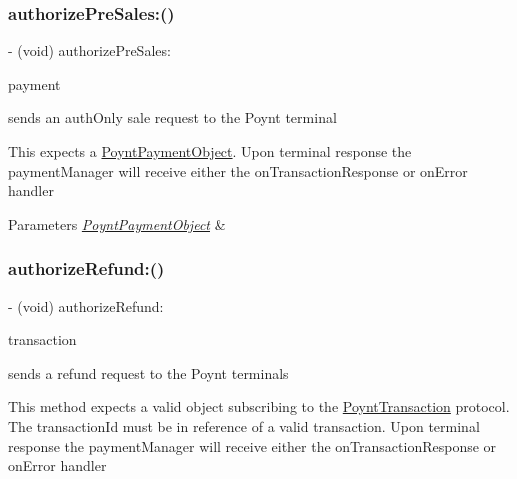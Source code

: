 \subsubsection{\texorpdfstring{authorize\+Pre\+Sales\+:()}{authorizePreSales:()}}
{\footnotesize\ttfamily -\/ (void) authorize\+Pre\+Sales\+: \begin{DoxyParamCaption}\item[{(\hyperlink{interface_poynt_payment_object}{Poynt\+Payment\+Object} $\ast$)}]{payment }\end{DoxyParamCaption}}



sends an auth\+Only sale request to the Poynt terminal 

This expects a \hyperlink{interface_poynt_payment_object}{Poynt\+Payment\+Object}. Upon terminal response the payment\+Manager will receive either the on\+Transaction\+Response or on\+Error handler


\begin{DoxyParams}{Parameters}
{\em \hyperlink{interface_poynt_payment_object}{Poynt\+Payment\+Object}} & \\
\hline
\end{DoxyParams}
\hypertarget{interface_poynt_p_o_s_connection_manager_a06494ca11a35277bc19c86dcfd34c8a4}{}\label{interface_poynt_p_o_s_connection_manager_a06494ca11a35277bc19c86dcfd34c8a4} 
\subsubsection{\texorpdfstring{authorize\+Refund\+:()}{authorizeRefund:()}}
{\footnotesize\ttfamily -\/ (void) authorize\+Refund\+: \begin{DoxyParamCaption}\item[{(id$<$ Poynt\+Transaction $>$)}]{transaction }\end{DoxyParamCaption}}



sends a refund request to the Poynt terminals 

This method expects a valid object subscribing to the \hyperlink{class_poynt_transaction-p}{Poynt\+Transaction} protocol. The transaction\+Id must be in reference of a valid transaction. Upon terminal response the payment\+Manager will receive either the on\+Transaction\+Response or on\+Error handler


